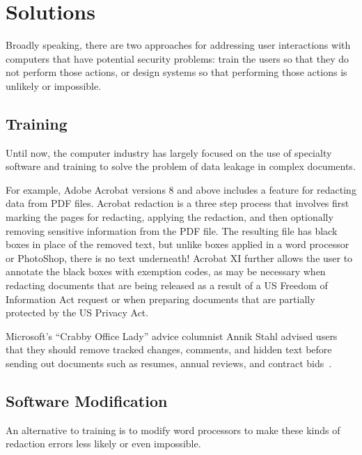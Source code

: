 \section{Solutions}
Broadly speaking, there are two approaches for addressing user
interactions with computers that have potential security problems:
train the users so that they do not perform those actions, or design
systems so that performing those actions is unlikely or
impossible. 


\subsection{Training}

Until now, the computer industry has largely focused on
the use of specialty software and training to solve the problem of
data leakage in complex documents. 

For example, Adobe Acrobat versions 8 and above includes a feature for
redacting data from PDF files. Acrobat redaction is a three step process
that involves first marking the pages for redacting, applying the
redaction, and then optionally removing sensitive information from the
PDF file. The resulting file has black boxes in place of the
removed text, but unlike boxes applied in a word processor or
PhotoShop, there is no text underneath!  Acrobat XI further allows
the user to annotate the black boxes with exemption codes, as may be
necessary when redacting documents that are being released as a result
of a US Freedom of Information Act request or when preparing documents
that are partially protected by the US Privacy Act. 


Microsoft's ``Crabby Office Lady'' advice columnist Annik Stahl
advised users that they should remove
tracked changes, comments, and hidden text before sending out
documents such as resumes, annual reviews, and contract
bids~\cite{microsoft-track-changes}.


\subsection{Software Modification}

An alternative to training is to modify
word processors to make these kinds of redaction errors less likely or
even impossible.

